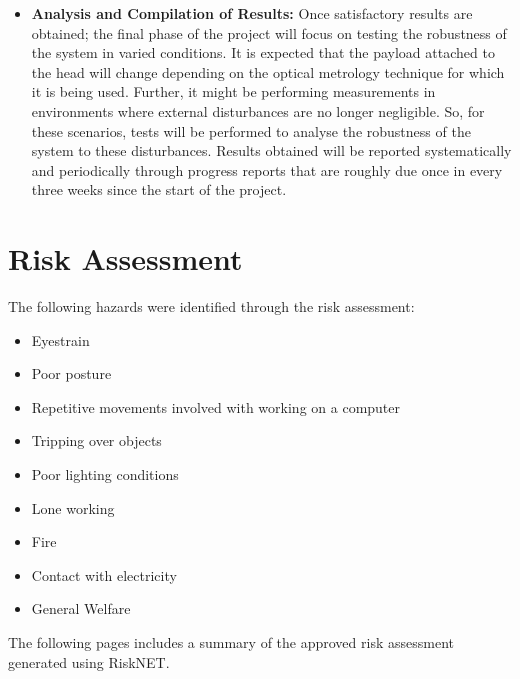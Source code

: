 \documentclass[a4paper,12pt]{report}
\begin{document}
\begin{appendices}
\begin{itemize}
		\item \textbf{Analysis and Compilation of Results:} Once satisfactory results are obtained; the final phase of the project will focus on testing the robustness of the system in varied conditions. It is expected that the payload attached to the head will change depending on the optical metrology technique for which it is being used. Further, it might be performing measurements in environments where external disturbances are no longer negligible. So, for these scenarios, tests will be performed to analyse the robustness of the system to these disturbances.
		Results obtained will be reported systematically and periodically through progress reports that are roughly due once in every three weeks since the start of the project.
	\end{itemize}
	
	
	\chapter{Risk Assessment}
	\label{appendix:b}
	The following hazards were identified through the risk assessment:
	\begin{itemize}
		\item Eyestrain
		\item Poor posture
		\item Repetitive movements involved with working on a computer
		\item Tripping over objects
		\item Poor lighting conditions
		\item Lone working
		\item Fire
		\item Contact with electricity
		\item General Welfare
	\end{itemize}
	The following pages includes a summary of the approved risk assessment generated using RiskNET.\\
	
\end{appendices}



\end{document}
